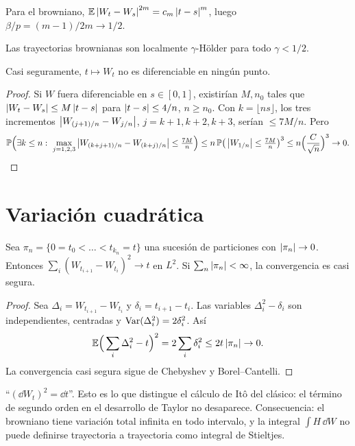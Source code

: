 Para el browniano, $\mathbb{E}\left\lvert W_t-W_s\right\rvert^{2m}=c_m\left\lvert t-s\right\rvert^m$, luego $\beta/p=(m-1)/2m\to1/2$.

\begin{corolario}
Las trayectorias brownianas son localmente $\gamma$-Hölder para todo $\gamma<1/2$.
\end{corolario}

\begin{teorema}
Casi seguramente, $t\mapsto W_t$ no es diferenciable en
ningún punto.
\end{teorema}

\begin{proof}
Si $W$ fuera diferenciable en $s\in[0,1]$, existirían $M,n_0$ tales que $\left\lvert W_t-W_s\right\rvert\le
M\left\lvert t-s\right\rvert$ para $\left\lvert t-s\right\rvert\le4/n$, $n\ge n_0$. Con $k=\lfloor ns\rfloor$, los tres incrementos $\left\lvert W_{(j+1)/n}-W_{j/n}\right\rvert$,
$j=k+1,k+2,k+3$, serían $\le7M/n$. Pero
\[
  \P\Big(\exists k\le n:\ \max_{j=1,2,3}\abs{W_{(k+j+1)/n}-W_{(k+j)/n}}\le\tfrac{7M}{n}\Big)\le n\,\P\big(\abs{W_{1/n}}\le\tfrac{7M}{n}\big)^3\le n\Big(\frac{C}{\sqrt n}\Big)^3\to0.
  \qedhere
\]
\end{proof}

\section{Variación cuadrática}

\begin{teorema}
Sea $\pi_n=\{0=t_0<\dots<t_{k_n}=t\}$ una sucesión de particiones con $\left\lvert \pi_n\right\rvert\to0$.
Entonces $\sum_i(W_{t_{i+1}}-W_{t_i})^2\to t$ en $L^2$. Si $\sum_n\left\lvert \pi_n\right\rvert<\infty$, la convergencia es casi segura.
\end{teorema}

\begin{proof}
Sea $\Delta_i=W_{t_{i+1}}-W_{t_i}$ y $\delta_i=t_{i+1}-t_i$. Las variables $\Delta_i^2-\delta_i$ son independientes,
centradas y $\operatorname{Var}(\Delta_i^2)=2\delta_i^2$. Así
\[
  \mathbb{E}\Big(\sum_i\Delta_i^2-t\Big)^2=2\sum_i\delta_i^2\le2t\left\lvert \pi_n\right\rvert\to0.
\]
La convergencia casi segura sigue de Chebyshev y Borel--Cantelli.
\end{proof}

\begin{intuicion}
``$(\dd W_t)^2=\dd t$''. Esto es lo que distingue el cálculo de Itô del clásico: el término de
segundo orden en el desarrollo de Taylor no desaparece. Consecuencia: el browniano
tiene variación total infinita en todo intervalo, y la integral $\int H\,\dd W$ no puede definirse
trayectoria a trayectoria como integral de Stieltjes.
\end{intuicion}

